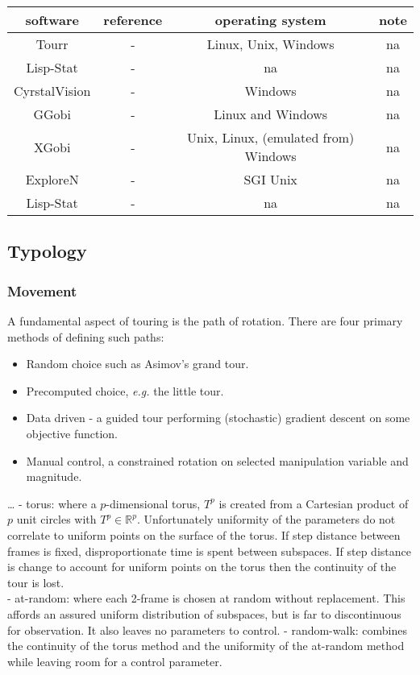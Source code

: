 \documentclass{monashthesis}
\theoremstyle{definition}
\theoremstyle{definition}
\theoremstyle{definition}
\theoremstyle{remark}
\begin{document}
\begin{table}[h!]
\centering
 \begin{tabular}{||c c c c||} 
 \hline
 software & reference & operating system & note \\
 \hline\hline
 Tourr & - & Linux, Unix, Windows & na \\
 Lisp-Stat & - & na & na \\
 CyrstalVision & - & Windows & na \\
 GGobi & - & Linux and Windows & na \\
 XGobi & - & Unix, Linux, (emulated from) Windows & na \\
 ExploreN & - & SGI Unix & na \\
 Lisp-Stat & - & na & na \\
 \hline
 \end{tabular}
\end{table}

\subsection{Typology}\label{typology}

\subsubsection{Movement}\label{movement}

A fundamental aspect of touring is the path of rotation. There are four
primary methods of defining such
paths\autocite{buja_computational_2005}:

\begin{itemize}
\tightlist
\item
  Random choice such as Asimov's grand tour\autocite{asimov_grand_1985}.
\item
  Precomputed choice, \emph{e.g.} the little
  tour\autocite{mcdonald_interactive_1982}.
\item
  Data driven - a guided tour performing (stochastic) gradient descent
  on some objective function\autocite{hurley_analyzing_1990}.
\item
  Manual control, a constrained rotation on selected manipulation
  variable and magnitude\autocite{cook_manual_1997}.
\end{itemize}

\ldots{} - torus: where a \(p\)-dimensional torus, \(T^p\) is created
from a Cartesian product of \(p\) unit circles with
\(T^p \in \mathbb{R}^p\). Unfortunately uniformity of the parameters do
not correlate to uniform points on the surface of the torus. If step
distance between frames is fixed, disproportionate time is spent between
subspaces. If step distance is change to account for uniform points on
the torus then the continuity of the tour is lost.\\
- at-random: where each 2-frame is chosen at random without replacement.
This affords an assured uniform distribution of subspaces, but is far to
discontinuous for observation. It also leaves no parameters to control.
- random-walk: combines the continuity of the torus method and the
uniformity of the at-random method while leaving room for a control
parameter.
\end{document}
